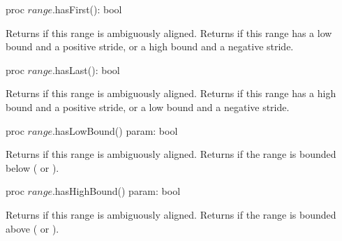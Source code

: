 \begin{protohead}
proc $range$.hasFirst(): bool
\end{protohead}
\begin{protobody}
Returns  if this range is ambiguously aligned.
Returns  if this range has a low bound and a positive stride, or a high
bound and a negative stride.
\end{protobody}

\begin{protohead}
proc $range$.hasLast(): bool
\end{protohead}
\begin{protobody}
Returns  if this range is ambiguously aligned.
Returns  if this range has a high bound and a positive stride, or a low
bound and a negative stride.
\end{protobody}

\begin{protohead}
proc $range$.hasLowBound() param: bool
\end{protohead}
\begin{protobody}
Returns  if this range is ambiguously aligned.
Returns  if the range is bounded below ( or ).
\end{protobody}

\begin{protohead}
proc $range$.hasHighBound() param: bool
\end{protohead}
\begin{protobody}
Returns  if this range is ambiguously aligned.
Returns  if the range is bounded above ( or ).
\end{protobody}

